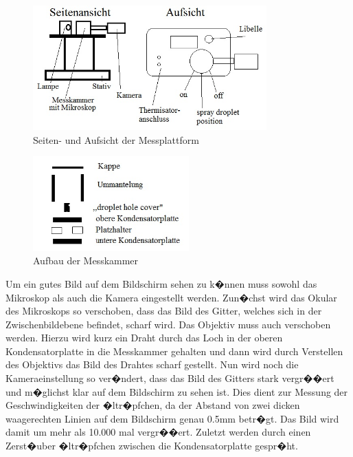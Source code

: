 \documentclass{scrartcl}
\begin{document}
\begin{figure}[htb!]
	\centering
	\includegraphics[width=9cm]{pics/Messplattform}
	\caption{Seiten- und Aufsicht der Messplattform}
	\label{fig:Messplattform}
\end{figure}

\begin{figure}[htb!]
	\centering
	\includegraphics[width=6cm]{pics/Messkammer}
	\caption{Aufbau der Messkammer}
	\label{fig:Messkammer}
\end{figure}

Um ein gutes Bild auf dem Bildschirm sehen zu
k�nnen muss sowohl das Mikroskop als auch die Kamera eingestellt
werden. Zun�chst wird das Okular des Mikroskops so verschoben, dass
das Bild des Gitter, welches sich in der Zwischenbildebene befindet,
scharf wird. Das Objektiv muss auch verschoben werden. Hierzu wird
kurz ein Draht durch das Loch in der oberen Kondensatorplatte in die
Messkammer gehalten und dann wird durch Verstellen des Objektivs das
Bild des Drahtes scharf gestellt. Nun wird noch die Kameraeinstellung
so ver�ndert, dass das Bild des Gitters stark vergr��ert und m�glichst
klar auf dem Bildschirm zu sehen ist. Dies dient zur Messung der
Geschwindigkeiten der �ltr�pfchen, da der Abstand von zwei dicken
waagerechten Linien auf dem Bildschirm genau 0.5mm betr�gt. Das Bild
wird damit um mehr als 10.000 mal vergr��ert. Zuletzt werden durch
einen Zerst�uber �ltr�pfchen zwischen die Kondensatorplatte gespr�ht.
\end{document}
